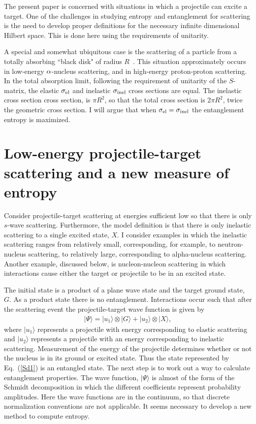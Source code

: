 \documentclass[prl,twocolumn,longbibliography,letterpaper,showpacs,groupedaddress,superscriptaddress,nofootinbib,floatfix,preprintnumbers,tightenlines]{revtex4-1}
\let\Oldsection\section
\renewcommand{\section}{\FloatBarrier\Oldsection}
\newcommand{\bea}{\begin{eqnarray}}
\newcommand{\eea}{\end{eqnarray}}
\newcommand{\eq}[1]{Eq.~(\ref{#1})}
\def\ra{\rangle}\def\la{\langle}
\def\s{\sigma}
\begin{document}
  The present paper is concerned with situations in which a projectile can  excite a target.   One of the challenges in studying entropy and entanglement  for scattering  is the need to develop proper definitions for the necessary infinite dimensional Hilbert space. This is done  here using the requirements of unitarity.
  

A special and somewhat ubiquitous case is the scattering of a  particle from a   totally absorbing ``black disk" of radius $R$~\cite{Kovchegov:2012mbw,Frauenfelder:1975dx,Gottfried2018}.   This situation approximately occurs in low-energy $\alpha$-nucleus scattering, and in high-energy proton-proton scattering.  In the  total absorption  limit, following the requirement of unitarity of the $S$-matrix,  the elastic $\s_{\rm el}$  and inelastic $\s_{\rm inel}$  cross sections are equal. The inelastic cross section cross section,  is $\pi R^2$, so that the total cross section is 2$\pi R^2$, twice the geometric cross section. I will argue that when $\s_{\rm el}=\s_{\rm inel}$ the entanglement entropy is maximized.

  \section{ Low-energy projectile-target scattering %
  and a new measure of entropy}
Consider projectile-target  scattering at energies sufficient low so that there is only $s$-wave scattering. Furthermore, the model definition is that there  is only  inelastic scattering to a single excited state, $X$. 
I  consider examples in which the inelastic scattering ranges from relatively small, corresponding, for example,  to neutron-nucleus scattering, 
to relatively large, corresponding to alpha-nucleus scattering. Another example, discussed below,  is nucleon-nucleon scattering in which interactions cause  either the target or projectile to be in an excited state.

The initial state is a product of a plane wave state and the target ground state, $G$. As a product state there is no entanglement. 
Interactions occur such that after the scattering event the projectile-target wave function is given by
\bea
 |\Psi\ra= |u_1\ra \otimes |G\ra+|u_2\ra \otimes |X\ra, \label{Sd1}
\eea
where $|u_1\ra$ represents a projectile with energy corresponding to elastic scattering and $|u_2\ra$ represents a projectile with an energy corresponding to inelastic scattering. Measurement of the energy of the projectile  determines whether or not the nucleus is in its ground or excited state. Thus the state represented by  \eq{Sd1} is an entangled state.  The next step is to work out a way to calculate entanglement properties.  The wave function, $|\Psi\ra$  is almost of  the form of the Schmidt decomposition in which the different coefficients represent probability amplitudes.  Here  the wave functions are in the continuum, so that discrete normalization conventions are not applicable.  It seems  necessary to develop a new method to compute entropy.
\end{document}
